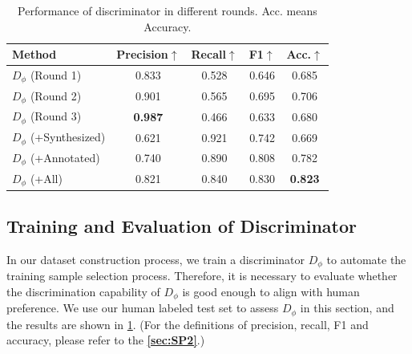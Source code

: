 \documentclass[10pt,twocolumn,letterpaper]{article}
\begin{document}
\begin{table}[t]
  \centering
  \begin{tabular}{@{}lcccc@{}}
    \toprule
    Method & Precision$\uparrow$ & Recall$\uparrow$ & F1$\uparrow$ & Acc.$\uparrow$\\
    \midrule
    $D_{\phi}$ (Round 1) & 0.833 & 0.528 & 0.646 & 0.685\\
    $D_{\phi}$ (Round 2) & 0.901 & 0.565 & 0.695 & 0.706\\
    $D_{\phi}$ (Round 3) & \textbf{0.987} & 0.466 & 0.633 & 0.680\\
    \midrule
    $D_{\phi}$ (+Synthesized) & 0.621 & 0.921 & 0.742 & 0.669 \\
    $D_{\phi}$ (+Annotated) & 0.740 & 0.890 & 0.808 & 0.782 \\
    $D_{\phi}$ (+All) & 0.821 & 0.840 & 0.830 & \textbf{0.823} \\
    \bottomrule
  \end{tabular}
\vspace{-3mm}
  \caption{Performance of discriminator in different rounds. Acc. means Accuracy.}
  \label{tab:discriminator}
  \vspace{-3mm}
\end{table}

\subsection{Training and Evaluation of Discriminator}
\label{sec:train_discriminator}

In our dataset construction process, we train a  discriminator $ D_{\phi} $ to automate the training sample selection process. Therefore, it is necessary to evaluate whether the discrimination capability of $ D_{\phi} $ is good enough to align with human preference. We use our human labeled test set to assess $ D_{\phi} $ in this section, and the results are shown in \cref{tab:discriminator}. (For the definitions of precision, recall, F1 and accuracy, please refer to the \textbf{\cref{sec:SP2}}.)
\end{document}
